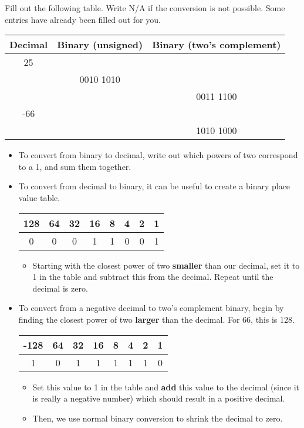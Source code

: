 \question Fill out the following table. Write N/A if the conversion is not possible. Some entries have already been filled out for you.

\begin{center}
  \begin{tabular}{|c|c|c|}
    \hline
    Decimal & Binary (unsigned) & Binary (two's complement) \\
    \hline\hline
    25 &  &  \\
    \hline
    & 0010 1010 & \\
    \hline
    &  & 0011 1100 \\
    \hline
    -66 &  &  \\
    \hline
    &  & 1010 1000 \\
    \hline
  \end{tabular}
\end{center}

\begin{itemize}
  \item To convert from binary to decimal, write out which powers of two correspond to a 1, and sum them together.
  \item To convert from decimal to binary, it can be useful to create a binary place value table.
  \begin{center}
  \begin{tabular}{|c|c|c|c|c|c|c|c|}
    \hline
    128 & 64 & 32 & 16 & 8 & 4 & 2 & 1 \\
    \hline
    0 & 0 & 0 & 1 & 1 & 0 & 0 & 1 \\
    \hline
  \end{tabular}
  \end{center}
  \begin{itemize}
    \item Starting with the closest power of two \textbf{smaller} than our decimal, set it to 1 in the table and subtract this from the decimal. Repeat until the decimal is zero.
  \end{itemize}
  \item To convert from a negative decimal to two's complement binary, begin by finding the closest power of two \textbf{larger} than the decimal. For 66, this is 128.
  \begin{center}
  \begin{tabular}{|c|c|c|c|c|c|c|c|}
    \hline
    -128 & 64 & 32 & 16 & 8 & 4 & 2 & 1 \\
    \hline
    1 & 0 & 1 & 1 & 1 & 1 & 1 & 0 \\
    \hline
  \end{tabular}
  \end{center}
  \begin{itemize}
    \item Set this value to 1 in the table and \textbf{add} this value to the decimal (since it is really a negative number) which should result in a positive decimal.
    \item Then, we use normal binary conversion to shrink the decimal to zero.
  \end{itemize}
\end{itemize}

